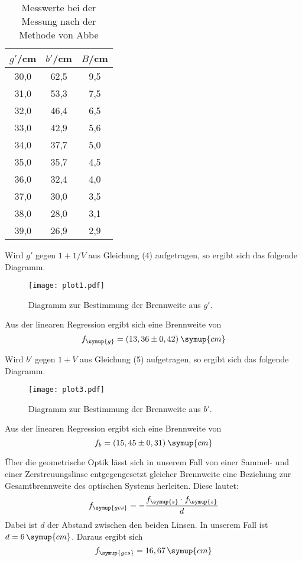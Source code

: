 \begin{table}[H]
  \centering
  \caption{Messwerte bei der Messung nach der Methode von Abbe}
  \label{tab:abbe}
  \begin{tabular}{c c c}
    \toprule
    $g'$/cm  & $b'$/cm & $B$/cm \\
    \midrule
    30,0  &  62,5  &  9,5 \\
    31,0  &  53,3  &  7,5 \\
    32,0  &  46,4  &  6,5 \\
    33,0  &  42,9  &  5,6 \\
    34,0  &  37,7  &  5,0 \\
    35,0  &  35,7  &  4,5 \\
    36,0  &  32,4  &  4,0 \\
    37,0  &  30,0  &  3,5 \\
    38,0  &  28,0  &  3,1 \\
    39,0  &  26,9  &  2,9 \\
    \bottomrule
  \end{tabular}
\end{table}

Wird $g'$ gegen $1+1/V$ aus Gleichung (4) aufgetragen, so ergibt sich das folgende Diagramm.

\begin{figure}[H]
  \centering
  \texttt{[image: plot1.pdf]}
  \caption{Diagramm zur Bestimmung der Brennweite aus $g'$.}
  \label{fig:plot1}
\end{figure}

Aus der linearen Regression ergibt sich eine Brennweite von
\begin{equation*}
  f_{\symup{g}} = (13,36 \pm 0,42)\: \symup{cm}
\end{equation*}

Wird $b'$ gegen $1+V$ aus Gleichung (5) aufgetragen, so ergibt sich das folgende Diagramm.

\begin{figure}[H]
  \centering
  \texttt{[image: plot3.pdf]}
  \caption{Diagramm zur Bestimmung der Brennweite aus $b'$.}
  \label{fig:plot3}
\end{figure}

Aus der linearen Regression ergibt sich eine Brennweite von
\begin{equation*}
  f_b = (15,45 \pm 0,31)\: \symup{cm}
\end{equation*}

Über die geometrische Optik lässt sich in unserem Fall von einer Sammel- und einer Zerstreuungslinse
entgegengesetzt gleicher Brennweite eine Beziehung zur Gesamtbrennweite des optischen Systems herleiten.
Diese lautet:
\begin{equation*}
  f_{\symup{ges}} = -\frac{f_{\symup{s}}\cdot f_{\symup{z}}}{d}
\end{equation*}
Dabei ist $d$ der Abstand zwischen den beiden Linsen. In unserem Fall ist $d = 6\,\symup{cm}$.
Daraus ergibt sich
\begin{equation*}
  f_{\symup{ges}} = 16,67\,\symup{cm}
\end{equation*}
